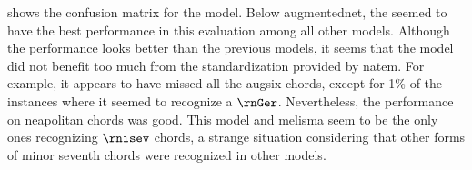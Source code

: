 
 shows the confusion
matrix for the \textcite{mcleod2021modular} model. Below
\gls{augmentednet}, the \textcite{mcleod2021modular} seemed
to have the best performance in this evaluation among all
other models. Although the performance looks better than the
previous models, it seems that the model did not benefit too
much from the standardization provided by \gls{natem}. For
example, it appears to have missed all the \gls{augsix}
chords, except for 1\% of the instances where it seemed to
recognize a $\rnGer$. Nevertheless, the performance on
\gls{neapolitan} chords was good. This model and
\gls{melisma} seem to be the only ones recognizing $\rnisev$
chords, a strange situation considering that other forms of
minor seventh chords were recognized in other models.

